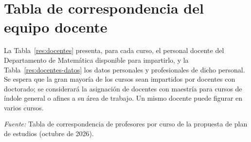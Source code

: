 \documentclass[11pt,a4paper]{article}
\begin{document}


\section{Tabla de correspondencia del equipo docente}

La Tabla~\ref{res:docentes} presenta, para cada curso, el personal docente del Departamento de Matemática disponible para impartirlo, y la Tabla~\ref{res:docentes-datos} los datos personales y profesionales de dicho personal. Se espera que la gran mayoría de los cursos sean impartidos por docentes con doctorado; se considerará la asignación de docentes con maestría para cursos de índole general o afines a su área de trabajo. Un mismo docente puede figurar en varios cursos.



{\footnotesize\noindent\textit{Fuente:} Tabla de correspondencia de profesores por curso de la propuesta de plan de estudios (octubre de 2026).\par}
\end{document}

